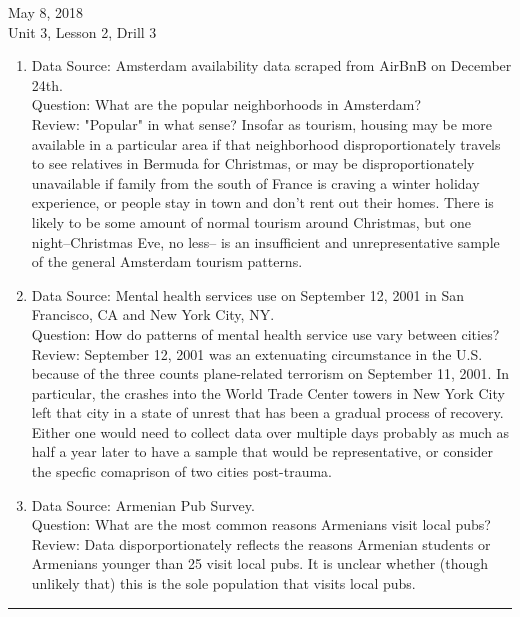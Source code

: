 \documentclass[final]{article}
\begin{document}
\noindent May 8, 2018\\
Unit 3, Lesson 2, Drill 3

\begin{enumerate}
\item Data Source: Amsterdam availability data scraped from AirBnB on December 24th. \\
Question: What are the popular neighborhoods in Amsterdam?\\
Review: "Popular" in what sense?  Insofar as tourism, housing may be more available in a particular area if that neighborhood disproportionately travels to see relatives in Bermuda for Christmas, or may be disproportionately unavailable if family from the south of France is craving a winter holiday experience, or people stay in town and don't rent out their homes.  There is likely to be some amount of normal tourism around Christmas, but one night--Christmas Eve, no less-- is an insufficient and unrepresentative sample of the general Amsterdam tourism patterns.  
\item Data Source: Mental health services use on September 12, 2001 in San Francisco, CA and New York City, NY. \\ Question: How do patterns of mental health service use vary between cities?\\
Review: September 12, 2001 was an extenuating circumstance in the U.S. because of the three counts plane-related terrorism on September 11, 2001.  In particular, the crashes into the World Trade Center towers in New York City left that city in a state of unrest that has been a gradual process of recovery. Either one would need to collect data over multiple days probably as much as half a year later to have a sample that would be representative, or consider the specfic comaprison of two cities post-trauma.   
\item Data Source: Armenian Pub Survey. \\
Question: What are the most common reasons Armenians visit local pubs?\\
Review: Data disporportionately reflects the reasons Armenian students or Armenians younger than 25 visit local pubs. It is unclear whether (though unlikely that) this is the sole population that visits local pubs.  

\end{enumerate}

\vspace{14pt}
\hrule
\vspace{24pt}
\pagebreak
\end{document}
